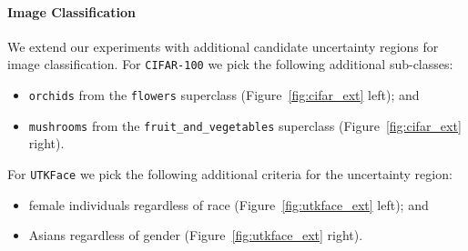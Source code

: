 \paragraph{Image Classification} We extend our experiments with additional candidate uncertainty regions for image classification. For \texttt{CIFAR-100} we pick the following additional sub-classes:
\begin{itemize}[noitemsep]
    \item \texttt{orchids} from the \texttt{flowers} superclass (Figure~\ref{fig:cifar_ext} left); and 
    \item \texttt{mushrooms} from the \texttt{fruit\_and\_vegetables} superclass (Figure~\ref{fig:cifar_ext} right).
\end{itemize}
For \texttt{UTKFace} we pick the following additional criteria for the uncertainty region:
\begin{itemize}[noitemsep]
    \item female individuals regardless of race (Figure~\ref{fig:utkface_ext} left); and
    \item Asians regardless of gender (Figure~\ref{fig:utkface_ext} right).
\end{itemize}

